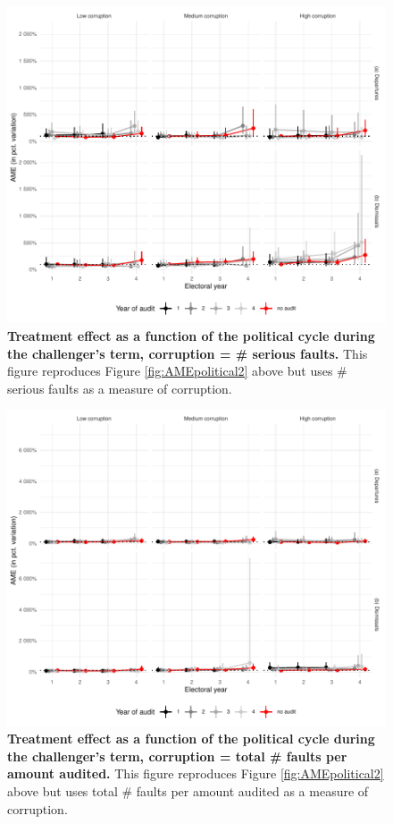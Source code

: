 {\begin{figure}[H]
    \centering
    \includegraphics{chapters/chapter_2/figures/AMEpoliticalSerious_term2Client.pdf}
    \caption{{\bf Treatment effect as a function of the political cycle during the challenger's term, corruption = \# serious faults.} This figure reproduces Figure \ref{fig:AMEpolitical2} above but uses \# serious faults as a measure of corruption.}
    \label{fig:AMEpolitical2_serious}
\end{figure}

\begin{figure}[H]
   \centering
   \includegraphics{chapters/chapter_2/figures/AMEpoliticalAllPerAMount_term2Client.pdf}
   \caption{{\bf Treatment effect as a function of the political cycle during the challenger's term, corruption = total \# faults per amount audited.} This figure reproduces Figure \ref{fig:AMEpolitical2} above but uses total \# faults per amount audited as a measure of corruption.}
   \label{fig:AMEpolitical2_allPerAmount}
\end{figure}

}
